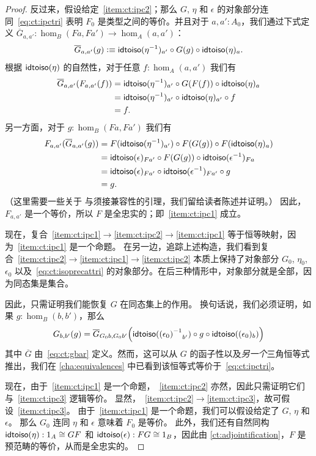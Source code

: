 \begin{proof}
  反过来，假设给定~\ref{item:ct:ipc2}；那么 $G$, $\eta$ 和 $\epsilon$ 的对象部分连同~\eqref{eq:ct:ipctri} 表明 $F_0$ 是类型之间的等价。并且对于 $a,a':A_0$，我们通过下式定义 $\overline{G}_{a,a'}: \hom_B(Fa,Fa') \to \hom_A(a,a')$：
  \begin{equation}
    \overline{G}_{a,a'}(g) \vcentcolon\equiv \mathsf{idtoiso}(\mathord{{\eta}^{-1}})_{a'} \circ G(g) \circ \mathsf{idtoiso}(\eta)_a.\label{eq:ct:gbar}
  \end{equation}
  根据 $\mathsf{idtoiso}(\eta)$ 的自然性，对于任意 $f:\hom_A(a,a')$ 我们有
  \begin{align*}
    \overline{G}_{a,a'}(F_{a,a'}(f))
    &= \mathsf{idtoiso}(\mathord{{\eta}^{-1}})_{a'} \circ G(F(f)) \circ \mathsf{idtoiso}(\eta)_a\\
    &= \mathsf{idtoiso}(\mathord{{\eta}^{-1}})_{a'} \circ \mathsf{idtoiso}(\eta)_{a'} \circ f \\
    &= f.
  \end{align*}
  另一方面，对于 $g:\hom_B(Fa,Fa')$ 我们有
  \begin{align*}
    F_{a,a'}(\overline{G}_{a,a'}(g))
    &= F(\mathsf{idtoiso}(\mathord{{\eta}^{-1}})_{a'}) \circ F(G(g)) \circ F(\mathsf{idtoiso}(\eta)_a)\\
    &= \mathsf{idtoiso}(\epsilon)_{Fa'}
    \circ F(G(g))
    \circ \mathsf{idtoiso}(\mathord{{\epsilon}^{-1}})_{Fa}\\
    &= \mathsf{idtoiso}(\epsilon)_{Fa'}
    \circ \mathsf{idtoiso}(\mathord{{\epsilon}^{-1}})_{Fa'}
    \circ g\\
    &= g.
  \end{align*}
  （这里需要一些关于 \idtoiso 与须接兼容性的引理，我们留给读者陈述并证明。）
  因此，$F_{a,a'}$ 是一个等价，所以 $F$ 是全忠实的；即~\ref{item:ct:ipc1} 成立。

  现在，复合~\ref{item:ct:ipc1}$\to$\ref{item:ct:ipc2}$\to$\ref{item:ct:ipc1} 等于恒等映射，因为~\ref{item:ct:ipc1} 是一个命题。
  在另一边，追踪上述构造，我们看到复合~\ref{item:ct:ipc2}$\to$\ref{item:ct:ipc1}$\to$\ref{item:ct:ipc2} 本质上保持了对象部分 $G_0$, $\eta_0$, $\epsilon_0$ 以及~\eqref{eq:ct:isoprecattri} 的对象部分。在后三种情形中，对象部分就是全部，因为同态集是集合。

  因此，只需证明我们能恢复 $G$ 在同态集上的作用。
  换句话说，我们必须证明，如果 $g:\hom_B(b,b')$，那么
  \[ G_{b,b'}(g) =
  \overline{G}_{G_0b,G_0b'}\Big(\mathsf{idtoiso}(\mathord{{(\epsilon_0)}^{-1}}_{b'}) \circ g \circ \mathsf{idtoiso}((\epsilon_0)_b)\Big)
  \]
  其中 $\overline{G}$ 由~\eqref{eq:ct:gbar} 定义。然而，这可以从 $G$ 的函子性以及\emph{另一个}三角恒等式推出，我们在 \cref{cha:equivalences} 中已看到该恒等式等价于~\eqref{eq:ct:ipctri}。

  现在，由于~\ref{item:ct:ipc1} 是一个命题，~\ref{item:ct:ipc2} 亦然，因此只需证明它们与~\ref{item:ct:ipc3} 逻辑等价。
  显然，~\ref{item:ct:ipc2}$\to$\ref{item:ct:ipc3}，故可假设~\ref{item:ct:ipc3}。
  由于~\ref{item:ct:ipc1} 是一个命题，我们可以假设给定了 $G$, $\eta$ 和 $\epsilon$。
  那么 $G_0$ 连同 $\eta$ 和 $\epsilon$ 意味着 $F_0$ 是等价。
  此外，我们还有自然同构 $\mathsf{idtoiso}(\eta):1_A\cong GF$ 和 $\mathsf{idtoiso}(\epsilon):FG\cong 1_B$，因此由 \cref{ct:adjointification}，$F$ 是预范畴的等价，从而是全忠实的。
\end{proof}

